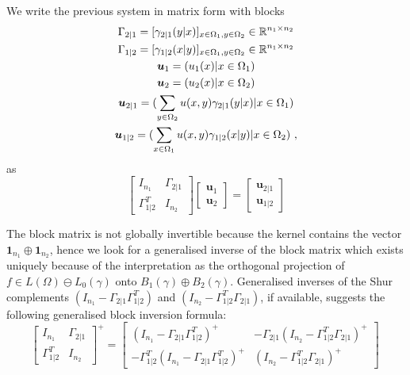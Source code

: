 \documentclass[runningheads]{llncs}
\begin{document}
We write the previous system in matrix form with blocks
\begin{gather*}
  \Gamma_{2|1} = [\gamma_{2|1}(y|x)]_{x \in \Omega_1, y \in \Omega_2} \in \mathbb R^{n_1 \times n_2} \\
  \Gamma_{1|2} = [\gamma_{1|2}(x|y)]_{x \in \Omega_1, y \in \Omega_2} \in \mathbb R^{n_1 \times n_2} \\
  \bm u_1 = (u_1(x) | x \in \Omega_1) \\
  \bm u_2 = (u_2(x) | x \in \Omega_2) \\
  \bm u_{2|1} = (\sum_{y \in \Omega_2} u(x,y)\gamma_{2|1}(y|x) | x \in \Omega_1) \\
  \bm u_{1|2} = (\sum_{x\in\Omega_1} u(x,y)\gamma_{1|2}(x|y) | x \in \Omega_2) \ ,
\end{gather*}
as 
\begin{equation}
\label{eq:block}
  \begin{bmatrix}
    I_{n_1} & \Gamma_{2|1} \\ \Gamma_{1|2}^T & I_{n_2}
  \end{bmatrix}
  \begin{bmatrix}
    \bm u_1 \\ \bm u_2
  \end{bmatrix}
=
\begin{bmatrix}
  \bm u_{2|1} \\ \bm u_{1|2}
\end{bmatrix}
\end{equation}

The block matrix is not globally invertible because the kernel contains the vector $\bm 1 _{n_1} \oplus \bm 1_{n_2}$, hence we look for a generalised inverse of the block matrix  which  exists uniquely because of the interpretation as the orthogonal projection of $f \in L(\Omega) \ominus L_0(\gamma)$ onto $B_1(\gamma)\oplus B_2(\gamma)$. Generalised inverses of the Shur complements $(I_{n_1}-\Gamma_{2|1}\Gamma_{1|2}^T)$ and $(I_{n_2}-\Gamma_{1|2}^T\Gamma_{2|1})$, if available, suggests the following generalised block inversion formula:
%
\begin{equation}
\label{eq:blocksolve}
\begin{bmatrix}
    I_{n_1} & \Gamma_{2|1} \\ \Gamma_{1|2}^T & I_{n_2}
  \end{bmatrix} ^+ =
  \begin{bmatrix}
    (I_{n_1}-\Gamma_{2|1}\Gamma_{1|2}^T)^{+} & - \Gamma_{2|1} (I_{n_2}-\Gamma_{1|2}^T\Gamma_{2|1})^{+} \\
 - \Gamma_{1|2}^T (I_{n_1}-\Gamma_{2|1}\Gamma_{1|2}^T)^{+} & (I_{n_2}-\Gamma_{1|2}^T\Gamma_{2|1})^{+} 
\end{bmatrix} \ 
\end{equation}
\end{document}
